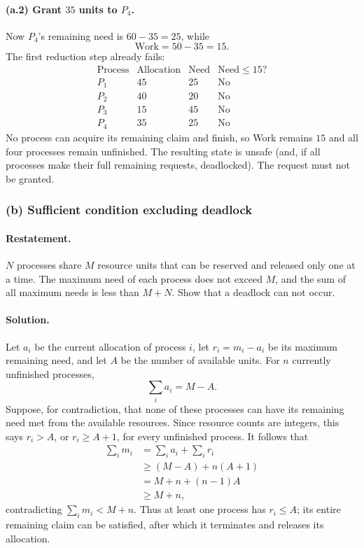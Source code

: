 \paragraph{(a.2) Grant \(35\) units to \(P_4\).}
Now \(P_4\)'s remaining need is \(60-35=25\), while
\[
\mathrm{Work}=50-35=15.
\]
The first reduction step already fails:
\[
\begin{array}{c|c|c|c}
\mathrm{Process}&\mathrm{Allocation}&\mathrm{Need}&
\mathrm{Need}\leq 15?\\ \hline
P_1&45&25&\mathrm{No}\\
P_2&40&20&\mathrm{No}\\
P_3&15&45&\mathrm{No}\\
P_4&35&25&\mathrm{No}
\end{array}
\]
No process can acquire its remaining claim and finish, so Work remains
\(15\) and all four processes remain unfinished.  The resulting state
is unsafe (and, if all processes make their full remaining requests,
deadlocked).  The request must not be granted.

\subsubsection*{(b) Sufficient condition excluding deadlock}

\paragraph{Restatement.}
\(N\) processes share \(M\) resource units that can be reserved and
released only one at a time.  The maximum need of each process does not
exceed \(M\), and the sum of all maximum needs is less than \(M+N\).
Show that a deadlock can not occur.

\paragraph{Solution.}
Let \(a_i\) be the current allocation of process \(i\), let
\(r_i=m_i-a_i\) be its maximum remaining need, and let \(A\) be the
number of available units.  For \(n\) currently unfinished processes,
\[
\sum_i a_i=M-A.
\]
Suppose, for contradiction, that none of these processes can have its
remaining need met from the available resources.  Since resource
counts are integers, this says \(r_i>A\), or \(r_i\geq A+1\), for every
unfinished process.  It follows that
\[
\begin{split}
\sum_i m_i
 &=\sum_i a_i+\sum_i r_i\\
 &\geq (M-A)+n(A+1)\\
 &=M+n+(n-1)A\\
 &\geq M+n,
\end{split}
\]
contradicting \(\sum_i m_i<M+n\).  Thus at least one process has
\(r_i\leq A\); its entire remaining claim can be satisfied, after which
it terminates and releases its allocation.

